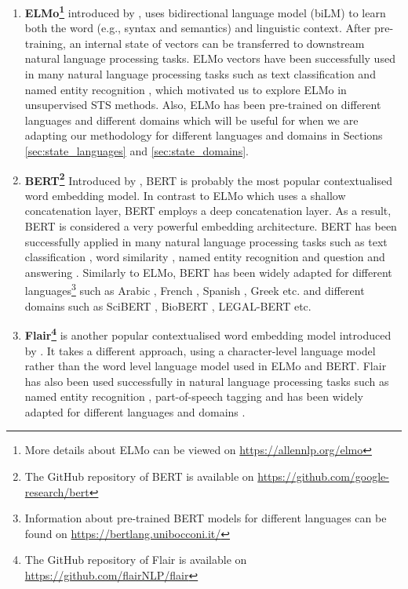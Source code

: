 \begin{enumerate}
\item \textbf{ELMo\footnote{More details about ELMo can be viewed on \url{https://allennlp.org/elmo}}}
introduced by \textcite{peters-etal-2018-deep}, uses bidirectional language model (biLM) to learn both the word (e.g., syntax and semantics) and linguistic context. After pre-training, an internal state of vectors can be transferred to downstream natural language processing tasks. ELMo vectors have been successfully used in many natural language processing tasks such as text classification \autocite{jiang-etal-2019-team} and named entity recognition \autocite{Luo2018}, which motivated us to explore ELMo in unsupervised STS methods. Also, ELMo has been pre-trained on different languages \autocite{che-EtAl:2018:K18-2} and different domains \autocite{jin2019probing} which will be useful for when we are adapting our methodology for different languages and domains in Sections \ref{sec:state_languages} and \ref{sec:state_domains}.

\item \textbf{BERT\footnote{The GitHub repository of BERT is available on \url{https://github.com/google-research/bert}}} Introduced by \textcite{devlin-etal-2019-bert}, BERT is probably the most popular contextualised word embedding model. In contrast to ELMo which uses a shallow concatenation layer, BERT employs a deep concatenation layer. As a result, BERT is considered a very powerful embedding architecture. BERT has been successfully applied in many natural language processing tasks such as text classification \autocite{Ranasinghe2019a}, word similarity \autocite{hettiarachchi-etal-2020-brums}, named entity recognition \autocite{10.1145/3394486.3403149} and question and answering \autocite{yang-etal-2019-end}. Similarly to ELMo, BERT has been widely adapted for different languages\footnote{Information about pre-trained BERT models for different languages can be found on \url{https://bertlang.unibocconi.it/}} such as Arabic \autocite{antoun-etal-2020-arabert}, French \autocite{martin-etal-2020-camembert}, Spanish \autocite{CaneteCFP2020}, Greek \autocite{10.1145/3411408.3411440} etc. and different domains such as SciBERT \autocite{beltagy-etal-2019-scibert}, BioBERT \autocite{10.1093/bioinformatics/btz682}, LEGAL-BERT \autocite{chalkidis-etal-2020-legal} etc.  

\item \textbf{Flair\footnote{The GitHub repository of Flair is available on \url{https://github.com/flairNLP/flair}}} is another popular contextualised word embedding model introduced by \textcite{akbik-etal-2018-contextual}. It takes a different approach, using a character-level language model rather than the word level language model used in ELMo and BERT. Flair has also been used successfully in natural language processing tasks such as named entity recognition \autocite{akbik-etal-2019-pooled}, part-of-speech tagging \autocite{akbik-etal-2018-contextual} and has been widely adapted for different languages and domains \autocite{akbik-etal-2018-contextual,sharma2019bioflair}.

\end{enumerate}

